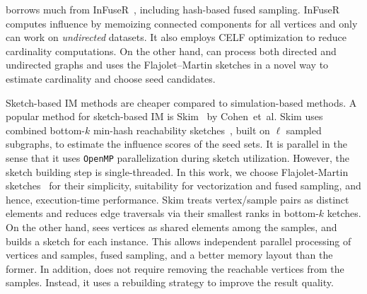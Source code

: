 \acro borrows much from {\sc InFuseR}~\cite{infuser}, including hash-based fused sampling. {\sc InFuseR} computes influence by memoizing connected components for all vertices and only can work on {\em undirected} datasets. It also employs CELF optimization to reduce cardinality computations. On the other hand, \acro can process both directed and undirected graphs and uses the Flajolet–Martin sketches in a novel way to estimate cardinality and choose seed candidates. 

Sketch-based IM methods are cheaper compared to simulation-based methods. 
A popular method for sketch-based IM is {\sc Skim}~\cite{cohen2014sketch} by Cohen~et~al. {\sc Skim} uses combined bottom-$k$ min-hash reachability sketches~\cite{bottomk,cohen2015all}, built on $\ell$ sampled subgraphs, to estimate the influence scores of the seed sets. It is parallel in the sense that it uses {\tt OpenMP} parallelization during sketch utilization. However, the sketch building step is single-threaded. In this work, we choose Flajolet-Martin sketches~\cite{flajolet1985probabilistic} for their simplicity, suitability for vectorization and fused sampling, and hence, execution-time performance. 
 {\sc Skim} treats vertex/sample pairs as distinct elements and reduces edge traversals via their smallest ranks in bottom-$k$ ketches. On the other hand, \acro sees vertices as shared elements among the samples, and builds a sketch for each instance. This allows independent parallel processing of vertices and samples, fused sampling, and a better memory layout than the former. In addition, \acro does not require removing the reachable vertices from the samples. Instead, it uses a rebuilding strategy to improve the result quality.
 
